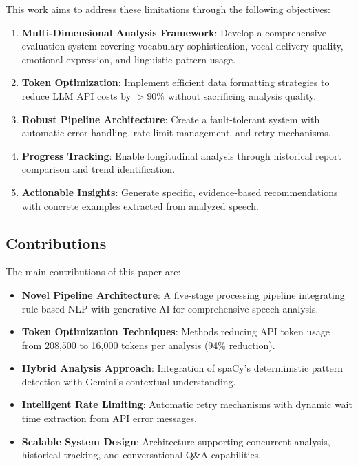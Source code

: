 \documentclass[conference]{IEEEtran}
\begin{document}
This work aims to address these limitations through the following objectives:

\begin{enumerate}
    \item \textbf{Multi-Dimensional Analysis Framework}: Develop a comprehensive evaluation system covering vocabulary sophistication, vocal delivery quality, emotional expression, and linguistic pattern usage.
    \item \textbf{Token Optimization}: Implement efficient data formatting strategies to reduce LLM API costs by $>$90\% without sacrificing analysis quality.
    \item \textbf{Robust Pipeline Architecture}: Create a fault-tolerant system with automatic error handling, rate limit management, and retry mechanisms.
    \item \textbf{Progress Tracking}: Enable longitudinal analysis through historical report comparison and trend identification.
    \item \textbf{Actionable Insights}: Generate specific, evidence-based recommendations with concrete examples extracted from analyzed speech.
\end{enumerate}

\subsection{Contributions}

The main contributions of this paper are:

\begin{itemize}
    \item \textbf{Novel Pipeline Architecture}: A five-stage processing pipeline integrating rule-based NLP with generative AI for comprehensive speech analysis.
    \item \textbf{Token Optimization Techniques}: Methods reducing API token usage from 208,500 to 16,000 tokens per analysis (94\% reduction).
    \item \textbf{Hybrid Analysis Approach}: Integration of spaCy's deterministic pattern detection with Gemini's contextual understanding.
    \item \textbf{Intelligent Rate Limiting}: Automatic retry mechanisms with dynamic wait time extraction from API error messages.
    \item \textbf{Scalable System Design}: Architecture supporting concurrent analysis, historical tracking, and conversational Q\&A capabilities.
\end{itemize}
\end{document}
